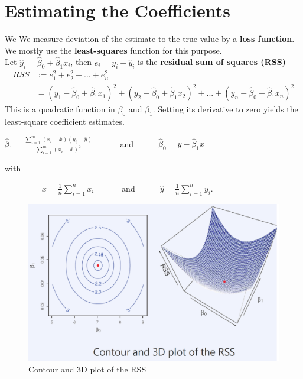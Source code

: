 	\section{Estimating the Coefficients}
		We We measure deviation of the estimate to the true value by a \textbf{loss function}.
		We mostly use the \textbf{least-squares} function for this purpose.\\
		Let $\hat{y}_i = \hat{\beta}_0 + \hat{\beta}_1 x_i$, then $e_i = y_i - \hat{y}_i$ is the 
		\textbf{residual sum of squares (RSS)}
		\begin{align*}
			RSS &:= e^2_1 + e^2_2 + ... + e^2_n\\
			&= (y_1 - \hat{\beta}_0 + \hat{\beta}_1 x_1)^2 + (y_2 - \hat{\beta}_0 + \hat{\beta}_1 x_2)^2
			+ ... + (y_n - \hat{\beta}_0 + \hat{\beta}_1 x_n)^2
		\end{align*}
		This is a quadratic function in $\beta_0$ and $\beta_1$.
		Setting its derivative to zero yields the least-square coefficient estimates.
		\begin{center}
			$\hat{\beta}_1 = \frac{\sum\limits_{i=1}^m (x_i-\bar{x})(y_i-\bar{y})}{\sum\limits_{i=1}^m (x_i-\bar{x})^2}$
			\ \ \ \ \ \ and\ \ \ \ \ \ 
			$\hat{\beta}_0 = \bar{y} - \hat{\beta}_1\bar{x}$
		\end{center}
		with
		\begin{center}
			\ \ \ \ \ \ \ \ \ 
			$\hat{x} = \frac{1}{n} \sum\limits_{i=1}^n x_i$
			\ \ \ \ \ \ and\ \ \ \ \ \ 
			$\hat{y} = \frac{1}{n} \sum\limits_{i=1}^n y_i$.
		\end{center}
		
		\begin{figure}[ht]
			\centering
			\includegraphics[width=1\linewidth]{Graphics/LinearRegression/1.png}
			\caption{Contour and 3D plot of the RSS}
		\end{figure}
	
